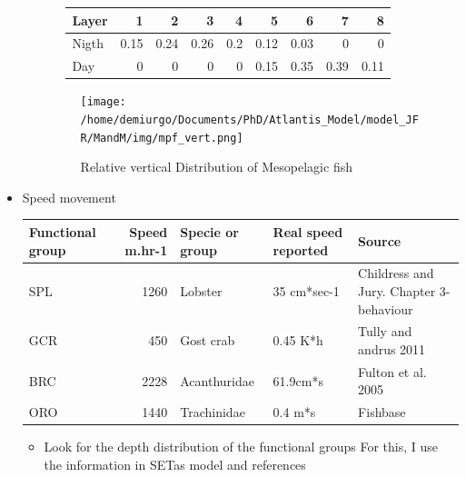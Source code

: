\documentclass[11pt]{article}
\begin{document}
\begin{itemize}
\begin{itemize}
\begin{itemize}
\begin{center}
\begin{tabular}{lrrrrrrrr}
 Layer  &     1  &     2  &     3  &    4  &     5  &     6  &     7  &     8  \\
\hline
 Nigth  &  0.15  &  0.24  &  0.26  &  0.2  &  0.12  &  0.03  &     0  &     0  \\
 Day    &     0  &     0  &     0  &    0  &  0.15  &  0.35  &  0.39  &  0.11  \\
\end{tabular}
\end{center}


\end{itemize}
\begin{figure}[htb]
  \centering
  \texttt{[image: /home/demiurgo/Documents/PhD/Atlantis\_Model/model\_JFR/MandM/img/mpf\_vert.png]}
  \caption{Relative vertical Distribution of Mesopelagic fish}
  \end{figure}
\end{itemize}

\item Speed movement\\
\label{sec-5-2-1-6-3}%
\begin{center}
\begin{tabular}{lrlll}
 Functional group  &  Speed m.hr-1  &  Specie or group  &  Real speed reported  &  Source                                   \\
\hline
 SPL               &          1260  &  Lobster          &  35 cm*sec-1          &  Childress and Jury. Chapter 3-behaviour  \\
 GCR               &           450  &  Gost crab        &  0.45 K*h             &  Tully and andrus 2011                    \\
 BRC               &          2228  &  Acanthuridae     &  61.9cm*s             &  Fulton et al. 2005                       \\
 ORO               &          1440  &  Trachinidae      &  0.4 m*s              &  Fishbase                                 \\
\end{tabular}
\end{center}



\begin{itemize}
\item Look for the depth distribution of the functional groups
  For this, I use the information in SETas model and references
\end{itemize}


\end{itemize}
\end{document}
